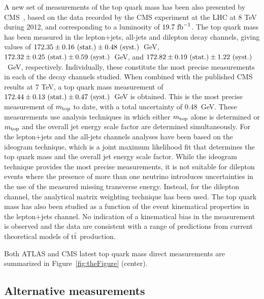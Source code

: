 \documentclass{blois}
\begin{document}
A new set of measurements of the top quark mass has been also presented by
CMS~\cite{bib:CMS-topMass8TeV}, based on the data recorded by the CMS experiment
at the LHC at 8 TeV during 2012, and corresponding to a luminosity of
$19.7~{\rm fb}^{-1}$. The top quark mass has been measured in the lepton+jets,
all-jets and dilepton decay channels, giving values of
$172.35 \pm 0.16~({\rm stat.}) \pm 0.48~({\rm syst.})$~GeV,
$172.32 \pm 0.25~({\rm stat.}) \pm 0.59~({\rm syst.})$~GeV, and
$172.82 \pm 0.19~({\rm stat.}) \pm 1.22~({\rm syst.})$~GeV, respectively.
Individually, these constitute the most precise measurements in each of the
decay channels studied. When combined with the published CMS results at 7 TeV,
a top quark mass measurement of
$172.44 \pm 0.13~({\rm stat.}) \pm 0.47~({\rm syst.})$~GeV is obtained. This is
the most precise measurement of $m_{\rm top}$ to date, with a total uncertainty
of 0.48~GeV. These measurements use analysis techniques in which either
$m_{\rm top}$ alone is determined or $m_{\rm top}$ and the overall jet energy
scale factor are determined simultaneously. For the lepton+jets and the all-jets
channels analyses have been based on the ideogram technique, which is a joint
maximum likelihood fit that determines the top quark mass and the overall jet
energy scale factor.
While the ideogram technique provides the most precise measurements, it is not
suitable for dilepton events where the presence of more than one neutrino
introduces uncertainties in the use of the measured missing transverse energy.
Instead, for the dilepton channel, the analytical matrix weighting technique
has been used.
The top quark mass has also been studied as a function of the event
kinematical properties in the lepton+jets channel. No indication of a kinematical
bias in the measurement is observed and the data are consistent with a range of
predictions from current theoretical models of ${\rm t{\bar t}}$ production.

Both ATLAS and CMS latest top quark mass direct measurements are summarized
in Figure~\ref{fig:theFigure} (center).


\subsection{Alternative measurements}
\end{document}
